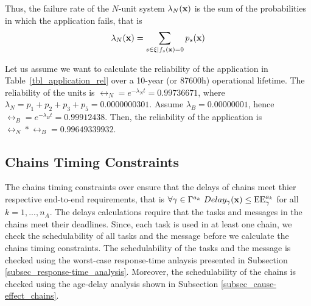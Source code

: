 Thus, the failure rate of the $N$-unit system $\lambda_N(\textbf{x})$ is the sum of the probabilities in which the application fails, that is
\[
	\lambda_N(\textbf{x})=\sum_{s\in \xi|f_s(\textbf{x})=0}p_s(\textbf{x})
\]
\begin{example}
Let us assume we want to calculate the reliability of the application in Table~\ref{tbl_application_rel} over a 10-year (or 87600h) operational lifetime. The reliability of the units is $\rel_N=e^{-\lambda_N t}=0.99736671$, where $\lambda_N=p_1+p_2+p_3+p_5=0.0000000301$. Assume $\lambda_B=0.00000001$, hence $\rel_B=e^{-\lambda_B t}=0.99912438$. Then, the reliability of the application is $\rel_N*\rel_B=0.99649339932$.
\end{example}



\subsection{Chains Timing Constraints}
The chains timing constraints over \ttx ensure that the delays of chains meet thier respective end-to-end requirements, that is $\forall \gamma\in \ssp{\Gamma}\ Delay_\gamma(\x)\leq \sss{\mathrm{EE}}[k][\gamma]$ for all $k=1,...,n_A$. The delays calculations require that the tasks and messages in the chains meet their deadlines. Since, each task is used in at least one chain, we check the schedulability of all tasks and the message  before we calculate the chains timing constraints. The schedulability of the tasks and the message is checked using the worst-case response-time anlaysis presented in Subsection \ref{subsec_response-time_analysis}. Moreover, the schedulability of the chains is checked using the age-delay analysis shown in Subsection \ref{subsec_cause-effect_chains}. 


